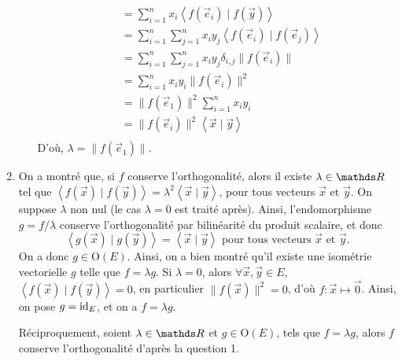 \documentclass[a4paper]{article}
\begin{document}
\begin{enumerate}
\begin{enumerate}
\begin{align*}
						&= \sum_{i=1}^n x_i \left<f(\vec{e}_i)  \mid f(\vec{y}) \right> \\
						&= \sum_{i=1}^n \sum_{j=1}^n x_i y_j \left<f(\vec{e}_i)  \mid f(\vec{e}_j) \right> \\
						&= \sum_{i=1}^n \sum_{j=1}^n x_i y_j \delta_{i,j} \|f(\vec{e}_i)\| \\
						&= \sum_{i=1}^n x_i y_i \|f(\vec{e}_i)\|^2 \\
						&= \|f(\vec{e}_1)\|^2 \sum_{i=1}^n x_i y_i \\
						&= \|f(\vec{e}_i)\|^2 \left<\vec{x} \mid \vec{y} \right> \\
					\end{align*}
					D'où, $\lambda = \|f(\vec{e}_1)\|$.
			\end{enumerate}
		\item On a montré que, si $f$\/ conserve l'orthogonalité, alors il existe $\lambda \in \R$\/ tel que $\left<f(\vec{x})  \mid f(\vec{y}) \right> = \lambda^2 \left<\vec{x}  \mid \vec{y} \right>$, pour tous vecteurs $\vec{x}$\/ et $\vec{y}$.
			On suppose $\lambda$\/ non nul (le cas $\lambda = 0$\/ est traité après).
			Ainsi, l'endomorphisme $g = f / \lambda$\/ conserve l'orthogonalité par bilinéarité du produit scalaire, et donc \[
				\left<g(\vec{x})  \mid g(\vec{y}) \right> = \left<\vec{x}  \mid \vec{y} \right> \text{ pour tous vecteurs } \vec{x} \text{ et } \vec{y}
			.\]
			On a donc $g \in \mathrm{O}(E)$. Ainsi, on a bien montré qu'il existe une isométrie vectorielle $g$\/ telle que $f = \lambda g$.
			Si $\lambda = 0$, alors $\forall \vec{x},\vec{y} \in E$, $\left<f(\vec{x})  \mid f(\vec{y}) \right> = 0$, en particulier $\|f(\vec{x})\|^2 = 0$, d'où $f : \vec{x} \mapsto \vec{0}$. Ainsi, on pose $g = \operatorname{id}_E$, et on a $f = \lambda g$.
			
			Réciproquement, soient $\lambda \in \R$\/ et $g \in \mathrm{O}(E)$, tels que $f = \lambda g$, alors $f$\/ conserve l'orthogonalité d'après la question 1.
	\end{enumerate}
\end{document}
